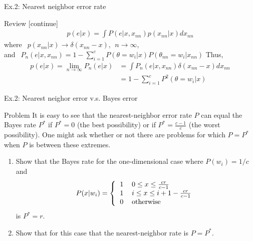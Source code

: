 \documentclass[compress,blue]{beamer}
\begin{document}
\begin{frame}{Ex.2: Nearest neighbor error rate}
	\begin{block}{Review [continue]}
		\begin{align}
			p(e|x) = \int P(e | x, x_{nn}) p(x_{nn} | x) dx_{nn}
		\end{align}
		where $~~p(x_{nn} | x) \rightarrow \delta(x_{nn} - x),~~ n \rightarrow \infty$, \\
		and $~~P_n(e | x, x_{nn}) = 1 - \sum_{i=1}^c P(\theta = w_i|x)P(\theta_{nn} = w_i | x_{nn})$ 
		Thus, 
		\begin{align}
			p(e|x) = \lim_{n\rightarrow \infty} P_n(e|x) &= \int P_n(e | x, x_{nn}) \delta(x_{nn} - x) dx_{nn}\\
			& = 1 - \sum_{i=1}^c P^2(\theta = w_i|x)
		\end{align}
	\end{block}
\end{frame}

\begin{frame}{Ex.2: Nearest neighor error v.s. Bayes error}
	\begin{block}{Problem}
		It is easy to see that the nearest-neighbor error rate $P$ can equal the Bayes rate $P^*$ if $P^*=0$ (the best possibility) or if $P^* = \frac{c-1}{c}$ (the worst possibility). One might ask whether or not there are problems for which $P=P^*$ when $P$ is between these extremes. 
		\begin{enumerate}
			\item Show that the Bayes rate for the one-dimensional case where $P(w_i) = 1/c$ and 
			\begin{align}
				P(x|w_i) = \left\{ 
				\begin{tabular}{ll}
				1 & $0\leq x\leq \frac{cr}{c-1}$ \\
				1 & $i\leq x \leq i + 1-\frac{cr}{c-1}$ \\
				0 & otherwise
				\end{tabular}
				\right.
			\end{align}
			is $P^* = r$.
			\item Show that for this case that the nearest-neighbor rate is $P=P^*$.
		\end{enumerate}
	\end{block}
\end{frame}
\end{document}
